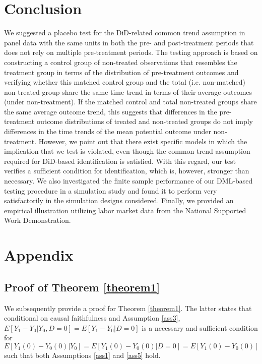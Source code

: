 {	\section{Conclusion}\label{co}
	
We suggested a placebo test for the DiD-related common trend assumption in panel data  with the same units in both the pre- and post-treatment periods that does not rely on multiple pre-treatment periods. The testing approach is based on constructing a control group of non-treated observations that resembles the treatment group in terms of the distribution of pre-treatment outcomes and verifying whether this matched control group and the total (i.e. non-matched) non-treated group share the same time trend in terms of their average outcomes (under non-treatment). If the matched control and total non-treated groups share the same average outcome trend, this suggests that differences in the pre-treatment outcome distributions of treated and non-treated groups do not imply differences in the time trends of the mean potential outcome under non-treatment. However, we point out that there exist specific models in which the implication that we test is violated, even though the common trend assumption required for DiD-based identification is satisfied. With this regard, our test verifies a sufficient condition for identification, which is, however, stronger than necessary.  
We also investigated the finite sample performance of our DML-based testing procedure in a simulation study and found it to perform very satisfactorily in the simulation designs considered. Finally, we provided an empirical illustration utilizing labor market data from the National Supported Work Demonstration.
	
	\newpage
	{\large \renewcommand{\theequation}{A-\arabic{equation}} 		\setcounter{equation}{0} \appendix
	}
	\appendix {}
	{\small
		\section{Appendix}
		
		\subsection{Proof of Theorem \ref{theorem1}}\label{proofth1}
		
		We subsequently provide a proof for Theorem \ref{theorem1}. 		The latter states that conditional on causal faithfulness and Assumption \ref{ass3},  $E[Y_1-Y_0|Y_0,D=0]=E[Y_1-Y_0|D=0]$ is a necessary and sufficient condition for $E[Y_1(0)-Y_0(0)| Y_0]=E[Y_1(0)-Y_0(0)|D=0]=E[Y_1(0)-Y_0(0)]$ such that both Assumptions \ref{ass1} and \ref{ass5} hold.
		
}}
